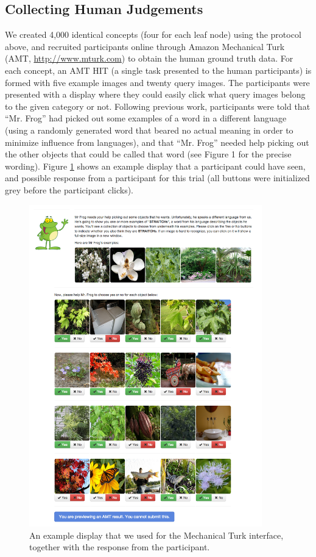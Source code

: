 \subsection{Collecting Human Judgements}

We created 4,000 identical concepts (four for each leaf node) using the protocol above, and recruited participants online through Amazon Mechanical Turk (AMT, \url{http://www.mturk.com}) to obtain the human ground truth data. For each concept, an AMT HIT (a single task presented to the human participants) is formed with five example images and twenty query images. The participants were presented with a display where they could easily click what query images belong to the given
category or not. Following previous work, participants were told that ``Mr. Frog'' had picked
out some examples of a word in a different language (using a randomly generated word that beared no actual meaning in order to minimize influence from languages), and that ``Mr. Frog'' needed help picking out the other objects that could be called that word (see Figure 1 for the precise wording). Figure \ref{fig:mrfrog} shows an example display that a participant could have seen, and possible response from a participant for this trial (all buttons were initialized grey before the participant clicks).

\begin{figure}
  \centering
  \includegraphics[width=0.9\textwidth]{figs/vcl/amt/amt_page_with_result.png}
  \caption{An example display that we used for the Mechanical Turk interface, together with the response from the participant.}\label{fig:mrfrog}
\end{figure}

